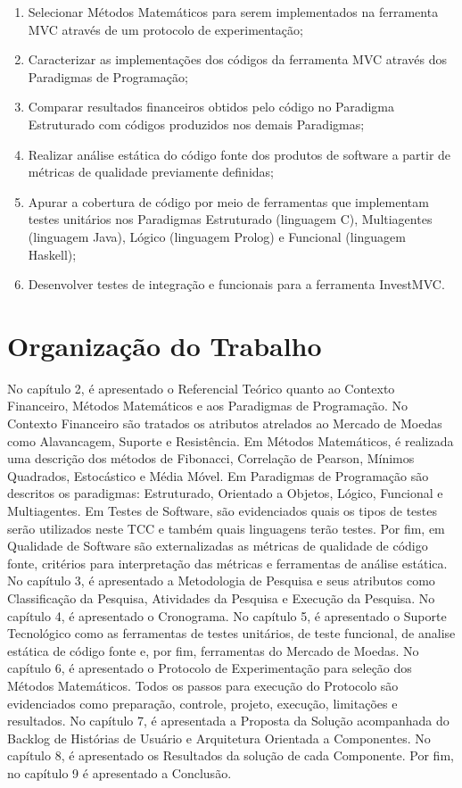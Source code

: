 \begin{enumerate}
\item Selecionar Métodos Matemáticos para serem implementados na ferramenta MVC através de um protocolo de experimentação;

\item Caracterizar as implementações dos códigos da ferramenta MVC através dos Paradigmas  de  Programação;

\item Comparar  resultados financeiros obtidos pelo código no Paradigma Estruturado com códigos produzidos nos demais Paradigmas;

\item Realizar análise estática do código fonte dos produtos de software a partir de métricas de qualidade previamente definidas;

\item Apurar a cobertura de código por meio de ferramentas que implementam testes unitários nos Paradigmas Estruturado (linguagem C), Multiagentes (linguagem Java), Lógico (linguagem Prolog) e Funcional (linguagem Haskell);

\item Desenvolver testes de integração e funcionais para a ferramenta InvestMVC.
\end{enumerate}

\section{Organização do Trabalho}

No capítulo 2, é apresentado o Referencial Teórico quanto ao Contexto Financeiro, Métodos Matemáticos e aos Paradigmas de Programação. No Contexto Financeiro são tratados os atributos atrelados ao Mercado de Moedas como Alavancagem, Suporte e Resistência. Em Métodos Matemáticos, é realizada uma descrição dos métodos de Fibonacci, Correlação de Pearson, Mínimos Quadrados, Estocástico e Média Móvel. Em Paradigmas de Programação são descritos os paradigmas: Estruturado, Orientado a Objetos, Lógico, Funcional e Multiagentes. Em Testes de Software, são evidenciados quais os tipos de testes serão utilizados neste TCC e também quais linguagens terão testes. Por fim, em Qualidade de Software são externalizadas as métricas de qualidade de  código fonte, critérios para interpretação das métricas e ferramentas de análise estática.
No capítulo 3, é apresentado a Metodologia de Pesquisa e seus atributos como Classificação da Pesquisa, Atividades da Pesquisa e Execução da Pesquisa.
No capítulo 4, é apresentado o Cronograma.
No capítulo 5, é apresentado o Suporte Tecnológico como as ferramentas de testes unitários, de teste funcional, de analise estática de código fonte e, por fim, ferramentas do Mercado de Moedas.
No capítulo 6, é apresentado o Protocolo de Experimentação para seleção dos Métodos Matemáticos. Todos os passos para execução do Protocolo são evidenciados como preparação, controle, projeto, execução, limitações e resultados.
No capítulo 7, é apresentada a Proposta da Solução acompanhada do Backlog de Histórias de Usuário e Arquitetura Orientada a Componentes.
No capítulo 8, é apresentado os Resultados da solução de cada Componente.
Por fim, no capítulo 9 é apresentado a Conclusão.